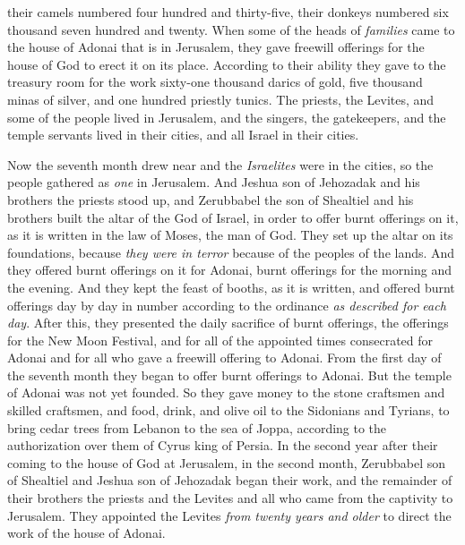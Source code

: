 \begin{biblechapter}
\verse their camels numbered four hundred and thirty-five, their donkeys numbered six thousand seven hundred and twenty.
 When some of the heads of \textit{families} came to the house of Adonai that is in Jerusalem, they gave freewill offerings for the house of God to erect it on its place.
\verse According to their ability they gave to the treasury room for the work sixty-one thousand darics of gold, five thousand minas of silver, and one hundred priestly tunics.
\verse The priests, the Levites, and some of the people lived in Jerusalem, and the singers, the gatekeepers, and the temple servants lived in their cities, and all Israel in their cities.
\end{biblechapter}

\begin{biblechapter} %
 Now the seventh month drew near and the \textit{Israelites} were in the cities, so the people gathered as \textit{one} in Jerusalem.
\verse And Jeshua son of Jehozadak and his brothers the priests stood up, and Zerubbabel the son of Shealtiel and his brothers built the altar of the God of Israel, in order to offer burnt offerings on it, as it is written in the law of Moses, the man of God.
\verse They set up the altar on its foundations, because \textit{they were in terror} because of the peoples of the lands. And they offered burnt offerings on it for Adonai, burnt offerings for the morning and the evening.
\verse And they kept the feast of booths, as it is written, and offered burnt offerings day by day in number according to the ordinance \textit{as described for each day}.
\verse After this, they presented the daily sacrifice of burnt offerings, the offerings for the New Moon Festival, and for all of the appointed times consecrated for Adonai and for all who gave a freewill offering to Adonai.
\verse From the first day of the seventh month they began to offer burnt offerings to Adonai. But the temple of Adonai was not yet founded.
\verse So they gave money to the stone craftsmen and skilled craftsmen, and food, drink, and olive oil to the Sidonians and Tyrians, to bring cedar trees from Lebanon to the sea of Joppa, according to the authorization over them of Cyrus king of Persia.
 In the second year after their coming to the house of God at Jerusalem, in the second month, Zerubbabel son of Shealtiel and Jeshua son of Jehozadak began their work, and the remainder of their brothers the priests and the Levites and all who came from the captivity to Jerusalem. They appointed the Levites \textit{from twenty years and older} to direct the work of the house of Adonai.

\end{biblechapter}
